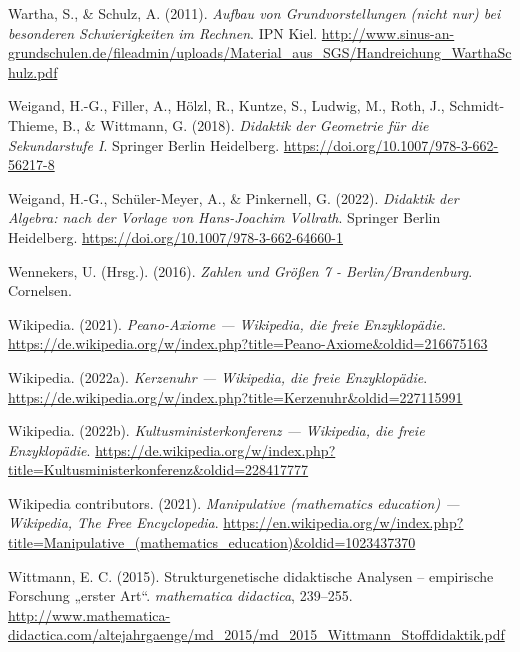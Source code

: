\documentclass[
]{scrbook}
\newlength{\cslhangindent}
\newlength{\cslentryspacingunit} %
\newenvironment{CSLReferences}[2] %
 {%
  \setlength{\parindent}{0pt}
  \ifodd #1
  \let\oldpar\par
  \def\par{\hangindent=\cslhangindent\oldpar}
  \fi
  \setlength{\parskip}{#2\cslentryspacingunit}
 }%
 {}
\theoremstyle{definition}
\theoremstyle{definition}
\theoremstyle{definition}
\theoremstyle{definition}
\theoremstyle{remark}
\begin{document}
\begin{CSLReferences}{1}{0}
\leavevmode{}%
Wartha, S., \& Schulz, A. (2011). \emph{Aufbau von {Grundvorstellungen} (nicht nur) bei besonderen {Schwierigkeiten} im {Rechnen}}. IPN Kiel. \url{http://www.sinus-an-grundschulen.de/fileadmin/uploads/Material_aus_SGS/Handreichung_WarthaSchulz.pdf}

\leavevmode{}%
Weigand, H.-G., Filler, A., Hölzl, R., Kuntze, S., Ludwig, M., Roth, J., Schmidt-Thieme, B., \& Wittmann, G. (2018). \emph{Didaktik der {Geometrie} für die {Sekundarstufe} {I}}. Springer Berlin Heidelberg. \url{https://doi.org/10.1007/978-3-662-56217-8}

\leavevmode{}%
Weigand, H.-G., Schüler-Meyer, A., \& Pinkernell, G. (2022). \emph{Didaktik der {Algebra}: nach der {Vorlage} von {Hans}-{Joachim} {Vollrath}}. Springer Berlin Heidelberg. \url{https://doi.org/10.1007/978-3-662-64660-1}

\leavevmode{}%
Wennekers, U. (Hrsg.). (2016). \emph{Zahlen und {Größen} 7 - {Berlin}/{Brandenburg}}. Cornelsen.

\leavevmode{}%
Wikipedia. (2021). \emph{Peano-Axiome --- Wikipedia{,} die freie Enzyklopädie}. \url{https://de.wikipedia.org/w/index.php?title=Peano-Axiome\&oldid=216675163}

\leavevmode{}%
Wikipedia. (2022a). \emph{Kerzenuhr --- Wikipedia{,} die freie Enzyklopädie}. \url{https://de.wikipedia.org/w/index.php?title=Kerzenuhr\&oldid=227115991}

\leavevmode{}%
Wikipedia. (2022b). \emph{Kultusministerkonferenz --- Wikipedia{,} die freie Enzyklopädie}. \url{https://de.wikipedia.org/w/index.php?title=Kultusministerkonferenz\&oldid=228417777}

\leavevmode{}%
Wikipedia contributors. (2021). \emph{Manipulative (mathematics education) --- {Wikipedia}{,} The Free Encyclopedia}. \url{https://en.wikipedia.org/w/index.php?title=Manipulative_(mathematics_education)\&oldid=1023437370}

\leavevmode{}%
Wittmann, E. C. (2015). Strukturgenetische didaktische {Analysen} -- empirische {Forschung} „erster {Art}``. \emph{mathematica didactica}, 239--255. \url{http://www.mathematica-didactica.com/altejahrgaenge/md_2015/md_2015_Wittmann_Stoffdidaktik.pdf}


\end{CSLReferences}
\end{document}
